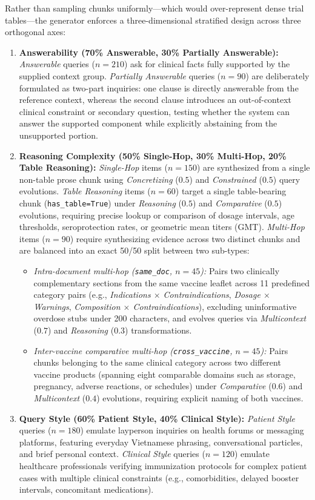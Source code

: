 \documentclass[sn-mathphys, oneside]{sn-jnl}
\newcommand{\artifact}[1]{\nolinkurl{#1}}
\begin{document}
Rather than sampling chunks uniformly—which would over-represent dense trial tables—the generator enforces a three-dimensional stratified design across three orthogonal axes:
\begin{enumerate}
\item \textbf{Answerability (70\% Answerable, 30\% Partially Answerable):} \emph{Answerable} queries ($n=210$) ask for clinical facts fully supported by the supplied context group. \emph{Partially Answerable} queries ($n=90$) are deliberately formulated as two-part inquiries: one clause is directly answerable from the reference context, whereas the second clause introduces an out-of-context clinical constraint or secondary question, testing whether the system can answer the supported component while explicitly abstaining from the unsupported portion.
\item \textbf{Reasoning Complexity (50\% Single-Hop, 30\% Multi-Hop, 20\% Table Reasoning):} \emph{Single-Hop} items ($n=150$) are synthesized from a single non-table prose chunk using \emph{Concretizing} ($0.5$) and \emph{Constrained} ($0.5$) query evolutions. \emph{Table Reasoning} items ($n=60$) target a single table-bearing chunk (\artifact{has_table=True}) under \emph{Reasoning} ($0.5$) and \emph{Comparative} ($0.5$) evolutions, requiring precise lookup or comparison of dosage intervals, age thresholds, seroprotection rates, or geometric mean titers (GMT). \emph{Multi-Hop} items ($n=90$) require synthesizing evidence across two distinct chunks and are balanced into an exact 50/50 split between two sub-types:
\begin{itemize}
\item \emph{Intra-document multi-hop (\artifact{same_doc}, $n=45$):} Pairs two clinically complementary sections from the same vaccine leaflet across 11 predefined category pairs (e.g., \emph{Indications $\times$ Contraindications}, \emph{Dosage $\times$ Warnings}, \emph{Composition $\times$ Contraindications}), excluding uninformative overdose stubs under 200 characters, and evolves queries via \emph{Multicontext} ($0.7$) and \emph{Reasoning} ($0.3$) transformations.
\item \emph{Inter-vaccine comparative multi-hop (\artifact{cross_vaccine}, $n=45$):} Pairs chunks belonging to the same clinical category across two different vaccine products (spanning eight comparable domains such as storage, pregnancy, adverse reactions, or schedules) under \emph{Comparative} ($0.6$) and \emph{Multicontext} ($0.4$) evolutions, requiring explicit naming of both vaccines.
\end{itemize}
\item \textbf{Query Style (60\% Patient Style, 40\% Clinical Style):} \emph{Patient Style} queries ($n=180$) emulate layperson inquiries on health forums or messaging platforms, featuring everyday Vietnamese phrasing, conversational particles, and brief personal context. \emph{Clinical Style} queries ($n=120$) emulate healthcare professionals verifying immunization protocols for complex patient cases with multiple clinical constraints (e.g., comorbidities, delayed booster intervals, concomitant medications).
\end{enumerate}
\end{document}
